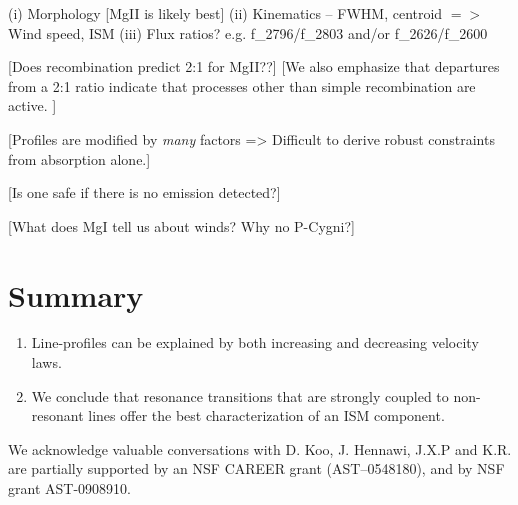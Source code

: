 \documentclass[12pt,preprint]{aastex}
\begin{document}
   (i)  Morphology [MgII is likely best]
  (ii)  Kinematics  --  FWHM, centroid $=>$  Wind speed, ISM
 (iii)  Flux ratios?  e.g.   f\_2796/f\_2803 and/or f\_2626/f\_2600

[Does recombination predict 2:1 for MgII??]
[We also emphasize that departures from a 2:1
ratio indicate that processes other than simple recombination are
active. ]

[Profiles are modified by {\it many} factors => Difficult to derive
robust constraints from absorption alone.]

[Is one safe if there is no emission detected?]

[What does MgI tell us about winds?  Why no P-Cygni?]

\section{Summary}
\label{sec:conclude}


\begin{enumerate}
\item Line-profiles can be explained by both increasing and decreasing
velocity laws.

\item We conclude that resonance transitions that are strongly coupled to
non-resonant lines offer the best
characterization of an ISM component.
\end{enumerate}

\acknowledgments

We acknowledge valuable conversations with D. Koo, J. Hennawi, 
J.X.P and K.R. are partially supported
by an NSF CAREER grant (AST--0548180), and 
by NSF grant AST-0908910.

\clearpage

%
%



\clearpage







\end{document}

